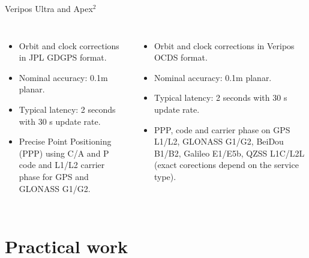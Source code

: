 \documentclass[11pt]{beamer}
\begin{document}
\begin{frame}{Veripos Ultra and Apex$^2$} %
	\begin{columns}[T,onlytextwidth]
		\begin{itemize}	
			\item Orbit and clock corrections in JPL GDGPS format.
			\item Nominal accuracy: 0.1m planar. 
			\item Typical latency: 2 seconds with 30 s update rate.%
			\item Precise Point Positioning (PPP) using C/A and P code and L1/L2 carrier phase for GPS and GLONASS G1/G2.
		\end{itemize}	
			\begin{itemize}	
			\item Orbit and clock corrections in Veripos OCDS format.
			\item Nominal accuracy: 0.1m planar. 
			\item Typical latency: 2 seconds with 30 s update rate.%
			\item PPP, code and carrier phase on GPS L1/L2, GLONASS G1/G2, BeiDou B1/B2, Galileo E1/E5b, QZSS L1C/L2L (exact corections depend on the service type).
			\end{itemize}	
	\end{columns}
\end{frame}



\section{Practical work}
\end{document}
